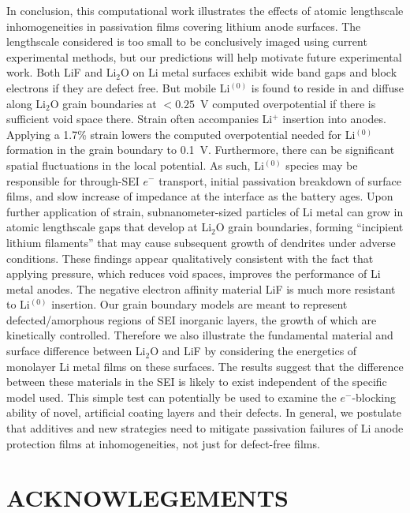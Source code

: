 \documentclass[prb,preprint,amsmath,amssymb]{revtex4}
\begin{document}
In conclusion, this computational work illustrates the effects of atomic
lengthscale inhomogeneities in passivation films covering lithium anode
surfaces.  The lengthscale considered is too small to be conclusively imaged
using current experimental methods, but our predictions will help
motivate future experimental work.  Both LiF and Li$_2$O on Li metal
surfaces exhibit wide band gaps and block electrons if they are defect
free.\cite{yue}  But mobile Li$^{(0)}$ is found to reside in and diffuse
along Li$_2$O grain boundaries at $<0.25$~V computed overpotential if there is 
sufficient void space there.  Strain often accompanies Li$^+$ insertion
into anodes. Applying a 1.7\% strain lowers the computed overpotential needed
for Li$^{(0)}$ formation in the grain boundary to 0.1~V.  Furthermore,
there can be significant spatial fluctuations in the local potential.
As such, Li$^{(0)}$ species may be responsible
for through-SEI $e^-$ transport, initial passivation breakdown of surface
films, and slow increase of impedance at the interface as the battery ages.  
Upon further application of strain, subnanometer-sized particles of Li metal
can grow in atomic lengthscale gaps that develop at Li$_2$O grain boundaries,
forming ``incipient lithium filaments'' that may cause subsequent growth of
dendrites under adverse conditions.  These findings appear qualitatively
consistent with the fact that applying pressure, which reduces void spaces,
improves the performance of Li metal anodes.\cite{pressure} The negative
electron affinity material LiF is much more resistant to Li$^{(0)}$ insertion.
Our grain boundary models are meant to represent defected/amorphous
regions of SEI inorganic layers, the growth of which are kinetically
controlled.  Therefore we also illustrate the fundamental material and
surface difference between Li$_2$O and LiF by considering the energetics
of monolayer Li metal films on these surfaces.  The results suggest that
the difference between these materials in the SEI is likely to exist
independent of the specific model used.  This simple test can potentially be
used to examine the $e^-$-blocking ability of novel, artificial coating layers
and their defects.  In general, we postulate that additives
and new strategies need to mitigate passivation failures of Li anode
protection films at inhomogeneities, not just for defect-free films.

\section*{ACKNOWLEGEMENTS}
 
\end{document}
